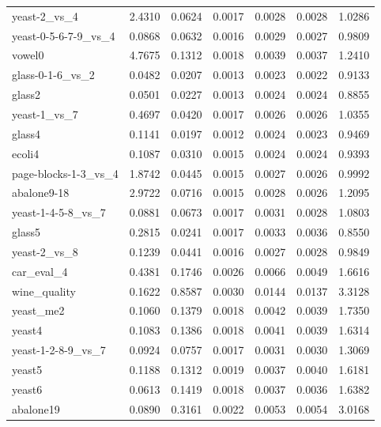 {\begin{table}[htbp]
{\begin{tabular}{lcccccc}
	    	yeast-2\_vs\_4 & 2.4310 & 0.0624 & 0.0017 & 0.0028 & 0.0028 & 1.0286 \\
	    	yeast-0-5-6-7-9\_vs\_4 & 0.0868 & 0.0632 & 0.0016 & 0.0029 & 0.0027 & 0.9809 \\
	    	vowel0 & 4.7675 & 0.1312 & 0.0018 & 0.0039 & 0.0037 & 1.2410 \\
	    	glass-0-1-6\_vs\_2 & 0.0482 & 0.0207 & 0.0013 & 0.0023 & 0.0022 & 0.9133 \\
	    	glass2 & 0.0501 & 0.0227 & 0.0013 & 0.0024 & 0.0024 & 0.8855 \\
	    	yeast-1\_vs\_7 & 0.4697 & 0.0420 & 0.0017 & 0.0026 & 0.0026 & 1.0355 \\
	    	glass4 & 0.1141 & 0.0197 & 0.0012 & 0.0024 & 0.0023 & 0.9469 \\
	    	ecoli4 & 0.1087 & 0.0310 & 0.0015 & 0.0024 & 0.0024 & 0.9393 \\
	    	page-blocks-1-3\_vs\_4 & 1.8742 & 0.0445 & 0.0015 & 0.0027 & 0.0026 & 0.9992 \\
	    	abalone9-18 & 2.9722 & 0.0716 & 0.0015 & 0.0028 & 0.0026 & 1.2095 \\
	    	yeast-1-4-5-8\_vs\_7 & 0.0881 & 0.0673 & 0.0017 & 0.0031 & 0.0028 & 1.0803 \\
	    	glass5 & 0.2815 & 0.0241 & 0.0017 & 0.0033 & 0.0036 & 0.8550 \\
	    	yeast-2\_vs\_8 & 0.1239 & 0.0441 & 0.0016 & 0.0027 & 0.0028 & 0.9849 \\
	    	car\_eval\_4 & 0.4381 & 0.1746 & 0.0026 & 0.0066 & 0.0049 & 1.6616 \\
	    	wine\_quality & 0.1622 & 0.8587 & 0.0030 & 0.0144 & 0.0137 & 3.3128 \\
	    	yeast\_me2 & 0.1060 & 0.1379 & 0.0018 & 0.0042 & 0.0039 & 1.7350 \\
	    	yeast4 & 0.1083 & 0.1386 & 0.0018 & 0.0041 & 0.0039 & 1.6314 \\
	    	yeast-1-2-8-9\_vs\_7 & 0.0924 & 0.0757 & 0.0017 & 0.0031 & 0.0030 & 1.3069 \\
	    	yeast5 & 0.1188 & 0.1312 & 0.0019 & 0.0037 & 0.0040 & 1.6181 \\
	    	yeast6 & 0.0613 & 0.1419 & 0.0018 & 0.0037 & 0.0036 & 1.6382 \\
	    	abalone19 & 0.0890 & 0.3161 & 0.0022 & 0.0053 & 0.0054 & 3.0168 \\
	    	\bottomrule
	    \end{tabular}%
		
	}
	\label{tab:ProcessingTime}%
\end{table}%

}
